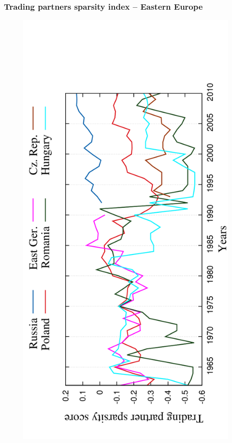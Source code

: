 \documentclass[11pt,xcolor=table]{beamer}
\begin{document}
\begin{frame}
  \frametitle{Trading partners sparsity index -- Eastern Europe}

  \begin{figure}
    \centering
    \includegraphics[angle=-90,scale=0.5]{../code/extra_results/trading_partner_density/scores/eastern_europe22.pdf}
  \end{figure}
\end{frame}
\end{document}
